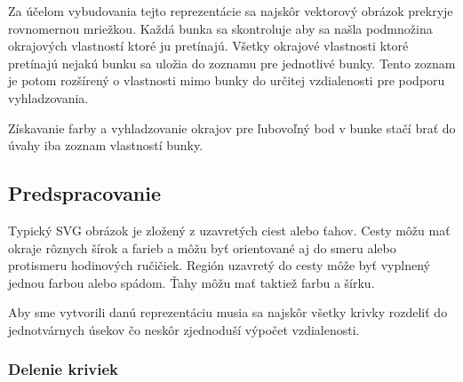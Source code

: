 Za účelom vybudovania tejto reprezentácie sa najskôr vektorový obrázok prekryje rovnomernou mriežkou. Každá bunka sa skontroluje aby sa našla podmnožina okrajových vlastností ktoré ju pretínajú. Všetky okrajové vlastnosti ktoré pretínajú nejakú bunku sa uložia do zoznamu pre jednotlivé bunky. Tento zoznam je potom rozšírený o vlastnosti mimo bunky do určitej vzdialenosti pre podporu vyhladzovania.

Získavanie farby a vyhladzovanie okrajov pre ľubovoľný bod v bunke stačí brať do úvahy iba zoznam vlastností bunky. 

\subsection{Predspracovanie}

Typický SVG obrázok je zložený z uzavretých ciest alebo ťahov. Cesty môžu mať okraje rôznych šírok a farieb a môžu byť orientované aj do smeru alebo protismeru hodinových ručičiek. Región uzavretý do cesty môže byť vyplnený jednou farbou alebo spádom. Ťahy môžu mať taktiež farbu a šírku. 

Aby sme vytvorili danú reprezentáciu musia sa najskôr všetky krivky rozdeliť do jednotvárnych úsekov čo neskôr zjednoduší výpočet vzdialenosti.

\subsubsection{Delenie kriviek}

